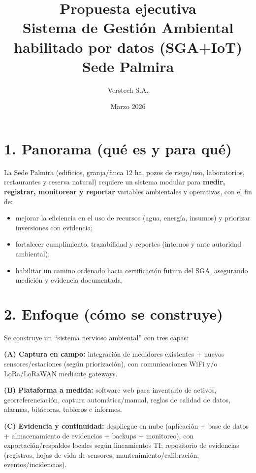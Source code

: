 \documentclass[11pt]{article}
\title{Propuesta ejecutiva \\Sistema de Gestión Ambiental habilitado por datos (SGA+IoT)\\Sede Palmira}
\author{Verstech S.A.}
\date{Marzo 2026}
\begin{document}
\maketitle
\vspace{-0.8em}

\section*{1. Panorama (qué es y para qué)}
La Sede Palmira (edificios, granja/finca 12 ha, pozos de riego/uso, laboratorios, restaurantes y reserva natural) requiere un sistema modular para \textbf{medir, registrar, monitorear y reportar} variables ambientales y operativas, con el fin de:
\begin{itemize}
  \item mejorar la eficiencia en el uso de recursos (agua, energía, insumos) y priorizar inversiones con evidencia;
  \item fortalecer cumplimiento, trazabilidad y reportes (internos y ante autoridad ambiental);
  \item habilitar un camino ordenado hacia certificación futura del SGA, asegurando medición y evidencia documentada.
\end{itemize}

\section*{2. Enfoque (cómo se construye)}
Se construye un ``sistema nervioso ambiental'' con tres capas:

\textbf{(A) Captura en campo:} integración de medidores existentes + nuevos sensores/estaciones (según priorización), con comunicaciones WiFi y/o LoRa/LoRaWAN mediante gateways.

\textbf{(B) Plataforma a medida:} software web para inventario de activos, georreferenciación, captura automática/manual, reglas de calidad de datos, alarmas, bitácoras, tableros e informes.

\textbf{(C) Evidencia y continuidad:} despliegue en nube (aplicación + base de datos + almacenamiento de evidencias + backups + monitoreo), con exportación/respaldos locales según lineamientos TI; repositorio de evidencias (registros, hojas de vida de sensores, mantenimiento/calibración, eventos/incidencias).
\end{document}
